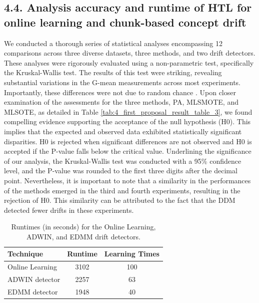 \subsection{4.4.	Analysis accuracy and runtime of HTL for online learning and chunk-based concept drift}
We conducted a thorough series of statistical analyses encompassing 12 comparisons across three diverse datasets, three methods, and two drift detectors. These analyses were rigorously evaluated using a non-parametric test, specifically the Kruskal-Wallis test. The results of this test were striking, revealing substantial variations in the G-mean measurements across most experiments. Importantly, these differences were not due to random chance \cite{yamada2013change}. Upon closer examination of the assessments for the three methods, PA, MLSMOTE, and MLSOTE, as detailed in Table \ref{tab:4_first_proposal_result_table_3}, we found compelling evidence supporting the acceptance of the null hypothesis (H0).
This implies that the expected and observed data exhibited statistically significant disparities. H0 is rejected when significant differences are not observed and H0 is accepted if the P-value falls below the critical value. Underlining the significance of our analysis, the Kruskal-Wallis test was conducted with a 95\% confidence level, and the P-value was rounded to the first three digits after the decimal point. Nevertheless, it is important to note that a similarity in the performances of the methods emerged in the third and fourth experiments, resulting in the rejection of H0. This similarity can be attributed to the fact that the DDM detected fewer drifts in these experiments.

\begin{table}[h]
  \centering
  \begin{tabular}{|l|c|c|}
  \hline
  \textbf{Technique}       & \textbf{Runtime} & \textbf{Learning Times} \\ \hline
  Online Learning          & 3102             & 100                     \\ \hline
  ADWIN detector           & 2257             & 63                      \\ \hline
  EDMM detector            & 1948             & 40                      \\ \hline
  \end{tabular}
  \caption{Runtimes (in seconds) for the Online Learning, ADWIN, and EDMM drift detectors.}
  \label{table:6_table4}
  \end{table}
  